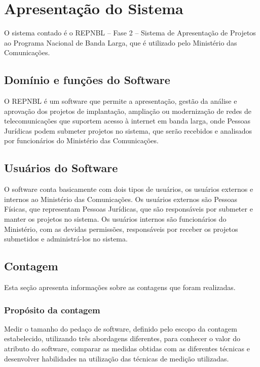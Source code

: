 \chapter{Apresentação do Sistema}

  O sistema contado é o REPNBL – Fase 2 – Sistema de Apresentação de Projetos ao Programa Nacional de Banda Larga,
  que é utilizado pelo Ministério das Comunicações.

    \section{Domínio e funções do Software}
	
	O REPNBL é um software que permite a apresentação, gestão da análise e aprovação dos projetos de implantação,
	ampliação ou modernização de redes de telecomunicações que suportem acesso à internet em banda larga, onde Pessoas 
	Jurídicas podem submeter projetos no sistema, que serão recebidos e analisados por funcionários do Ministério das Comunicações.
	
    \section{Usuários do Software}
	
	O software conta basicamente com dois tipos de usuários, os usuários externos e internos ao Ministério das Comunicações.
	Os usuários externos são Pessoas Físicas, que representam Pessoas Jurídicas, que são responsáveis por submeter e manter
	os projetos no sistema. Os usuários internos são funcionários do Ministério, com as devidas permissões, responsáveis por
	receber os projetos submetidos e administrá-los no sistema. 
	
    \section{Contagem}
      
      Esta seção apresenta informações sobre as contagens que foram realizadas.
      
	\subsection{Propósito da contagem}
		
	  Medir o tamanho do pedaço de software, definido pelo escopo da contagem estabelecido, 
	  utilizando três abordagens diferentes, para conhecer o valor do atributo do software, 
	  comparar as medidas obtidas com as diferentes técnicas e desenvolver habilidades na utilização
	  das técnicas de medição utilizadas.

